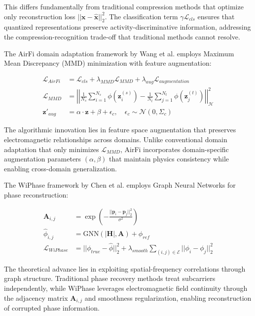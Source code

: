 \documentclass[journal]{IEEEtran}
\begin{document}
This differs fundamentally from traditional compression methods that optimize only reconstruction loss $||\mathbf{x} - \hat{\mathbf{x}}||_2^2$. The classification term $\gamma \mathcal{L}_{cls}$ ensures that quantized representations preserve activity-discriminative information, addressing the compression-recognition trade-off that traditional methods cannot resolve.

The AirFi domain adaptation framework by Wang et al. \cite{wang2022airfi} employs Maximum Mean Discrepancy (MMD) minimization with feature augmentation:

\begin{align}
\mathcal{L}_{AirFi} &= \mathcal{L}_{cls} + \lambda_{MMD} \mathcal{L}_{MMD} + \lambda_{aug} \mathcal{L}_{augmentation} \label{eq:airfi_total} \\
\mathcal{L}_{MMD} &= \left|\left|\frac{1}{N_s}\sum_{i=1}^{N_s}\phi(\mathbf{z}_i^{(s)}) - \frac{1}{N_t}\sum_{j=1}^{N_t}\phi(\mathbf{z}_j^{(t)})\right|\right|^2_{\mathcal{H}} \label{eq:mmd_distance} \\
\mathbf{z}'_{aug} &= \alpha \cdot \mathbf{z} + \beta + \epsilon_c, \quad \epsilon_c \sim \mathcal{N}(0, \Sigma_c) \label{eq:feature_augmentation}
\end{align}

The algorithmic innovation lies in feature space augmentation that preserves electromagnetic relationships across domains. Unlike conventional domain adaptation that only minimizes $\mathcal{L}_{MMD}$, AirFi incorporates domain-specific augmentation parameters $(\alpha, \beta)$ that maintain physics consistency while enabling cross-domain generalization.

The WiPhase framework by Chen et al. \cite{chen2024wiphase} employs Graph Neural Networks for phase reconstruction:

\begin{align}
\mathbf{A}_{i,j} &= \exp\left(-\frac{||\mathbf{p}_i - \mathbf{p}_j||_2^2}{\sigma^2}\right) \label{eq:adjacency_matrix} \\
\hat{\phi}_{i,j} &= \text{GNN}(|\mathbf{H}|, \mathbf{A}) + \phi_{ref} \label{eq:phase_reconstruction} \\
\mathcal{L}_{WiPhase} &= ||\phi_{true} - \hat{\phi}||_2^2 + \lambda_{smooth} \sum_{(i,j) \in \mathcal{E}} ||\phi_i - \phi_j||_2^2 \label{eq:wiphase_loss}
\end{align}

The theoretical advance lies in exploiting spatial-frequency correlations through graph structure. Traditional phase recovery methods treat subcarriers independently, while WiPhase leverages electromagnetic field continuity through the adjacency matrix $\mathbf{A}_{i,j}$ and smoothness regularization, enabling reconstruction of corrupted phase information.
\end{document}
